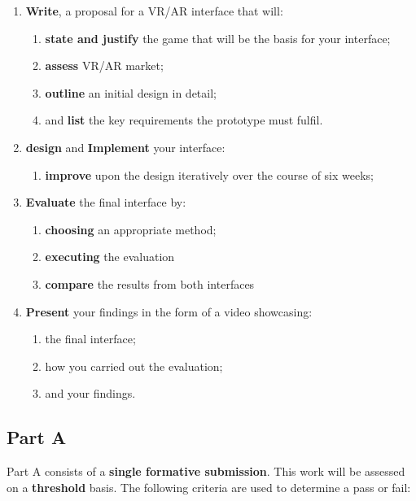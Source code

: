 \documentclass{../../fal_assignment}
\begin{document}
\begin{enumerate}[label=(\Alph*)]
    \item \textbf{Write}, a proposal for a VR/AR interface that will:
    	\begin{enumerate}[label=\roman*.]
    		\item \textbf{state and justify} the game that will be the basis for your interface;
		\item \textbf{assess} VR/AR market;
		\item \textbf{outline} an initial design in detail;
		\item and \textbf{list} the key requirements the prototype must fulfil.
	\end{enumerate}
    \item \textbf{design} and \textbf{Implement} your interface:
    	\begin{enumerate}[label=\roman*.]
		\item \textbf{improve} upon the design iteratively over the course of six weeks;
	\end{enumerate}
    \item \textbf{Evaluate} the final interface by:
    	\begin{enumerate}[label=\roman*.]
		\item \textbf{choosing} an appropriate method;
		\item \textbf{executing} the evaluation
		\item \textbf{compare} the results from both interfaces
	\end{enumerate}
    \item \textbf{Present} your findings in the form of a video showcasing: 
    	    	\begin{enumerate}[label=\roman*.]
    		\item the final interface;
    		\item how you carried out the evaluation;
		\item and your findings.
	\end{enumerate}
\end{enumerate}


\subsection*{Part A}

Part A consists of a \textbf{single formative submission}. This work will be assessed on a \textbf{threshold} basis. The following criteria are used to determine a pass or fail:
\end{document}
